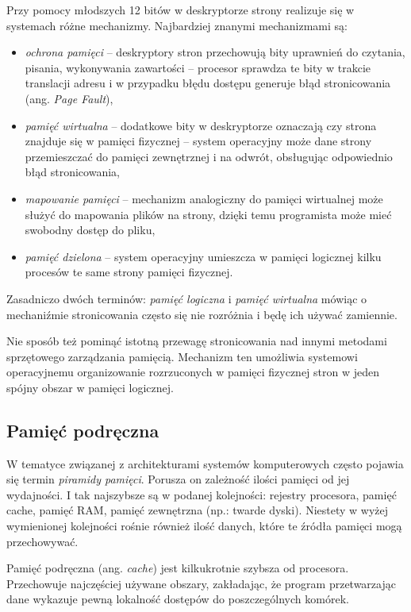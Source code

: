 \documentclass[12pt,a4paper,titlepage,twoside]{mwart}
\begin{document}
Przy pomocy młodszych 12 bitów w deskryptorze strony realizuje się w systemach
różne mechanizmy. Najbardziej znanymi mechanizmami są:
\begin{itemize}
\item \textit{ochrona pamięci} -- deskryptory stron przechowują bity uprawnień do
czytania, pisania, wykonywania zawartości -- procesor sprawdza te bity w
trakcie translacji adresu i w przypadku błędu dostępu generuje błąd
stronicowania (ang. \textit{Page Fault}),
\item \textit{pamięć wirtualna} -- dodatkowe bity w deskryptorze oznaczają czy
strona znajduje się w pamięci fizycznej -- system operacyjny może dane strony
przemieszczać do pamięci zewnętrznej i na odwrót, obsługując odpowiednio błąd
stronicowania,
\item \textit{mapowanie pamięci} -- mechanizm analogiczny do pamięci wirtualnej
może służyć do mapowania plików na strony, dzięki temu programista może mieć
swobodny dostęp do pliku,
\item \textit{pamięć dzielona} -- system operacyjny umieszcza w pamięci logicznej kilku
procesów te same strony pamięci fizycznej.
\end{itemize}

Zasadniczo dwóch terminów: \textit{pamięć logiczna} i \textit{pamięć wirtualna}
mówiąc o mechaniźmie stronicowania często się nie rozróżnia i będę ich używać
zamiennie.

Nie sposób też pominąć istotną przewagę stronicowania nad innymi metodami
sprzętowego zarządzania pamięcią. Mechanizm ten umożliwia systemowi
operacyjnemu organizowanie rozrzuconych w pamięci fizycznej stron w jeden
spójny obszar w pamięci logicznej.

\subsection{Pamięć podręczna}
\label{CacheMemory}

W tematyce związanej z architekturami systemów komputerowych często pojawia się
termin \textit{piramidy pamięci}. Porusza on zależność ilości pamięci od jej
wydajności. I tak najszybsze są w podanej kolejności: rejestry procesora,
pamięć cache, pamięć RAM, pamięć zewnętrzna (np.: twarde dyski). Niestety w
wyżej wymienionej kolejności rośnie również ilość danych, które te źródła
pamięci mogą przechowywać.

Pamięć podręczna (ang. \textit{cache}) jest kilkukrotnie szybsza od procesora.
Przechowuje najczęściej używane obszary, zakładając, że program przetwarzając
dane wykazuje pewną lokalność dostępów do poszczególnych komórek.
\end{document}
